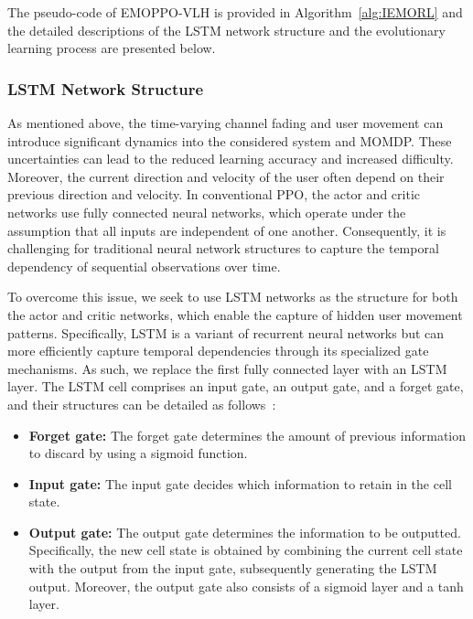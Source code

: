 \documentclass[10pt,journal,compsoc]{IEEEtran}
\begin{document}
\par The pseudo-code of EMOPPO-VLH is provided in Algorithm~\ref{alg:IEMORL} and the detailed descriptions of the LSTM network structure and the evolutionary learning process are presented below.

\subsubsection{LSTM Network Structure}

\par As mentioned above, the time-varying channel fading and user movement can introduce significant dynamics into the considered system and MOMDP. These uncertainties can lead to the reduced learning accuracy and increased difficulty. Moreover, the current direction and velocity of the user often depend on their previous direction and velocity. In conventional PPO, the actor and critic networks use fully connected neural networks, which operate under the assumption that all inputs are independent of one another. Consequently, it is challenging for traditional neural network structures to capture the temporal dependency of sequential observations over time.

\par To overcome this issue, we seek to use LSTM networks as the structure for both the actor and critic networks, which enable the capture of hidden user movement patterns. Specifically, LSTM is a variant of recurrent neural networks but can more efficiently capture temporal dependencies through its specialized gate mechanisms. As such, we replace the first fully connected layer with an LSTM layer. The LSTM cell comprises an input gate, an output gate, and a forget gate, and their structures can be detailed as follows~\cite{Chen2024information}:

\begin{itemize}
    \item \textbf{Forget gate:} The forget gate determines the amount of previous information to discard by using a sigmoid function. 

    \item \textbf{Input gate:} The input gate decides which information to retain in the cell state.

    \item \textbf{Output gate:} The output gate determines the information to be outputted. Specifically, the new cell state is obtained by combining the current cell state with the output from the input gate, subsequently generating the LSTM output. Moreover, the output gate also consists of a sigmoid layer and a tanh layer. 

\end{itemize}
\end{document}
